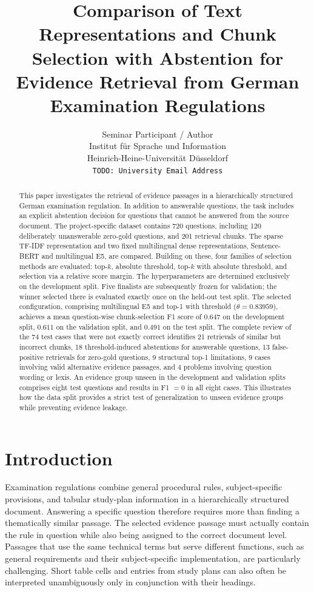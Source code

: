 \documentclass[11pt]{article}
\title{Comparison of Text Representations and Chunk Selection with Abstention for Evidence Retrieval from German Examination Regulations}
\author{Seminar Participant / Author \\
  Institut für Sprache und Information \\
  Heinrich-Heine-Universität Düsseldorf \\
  \texttt{TODO: University Email Address}}
\begin{document}
\maketitle

\begin{abstract}
This paper investigates the retrieval of evidence passages in a hierarchically structured German examination regulation. In addition to answerable questions, the task includes an explicit abstention decision for questions that cannot be answered from the source document. The project-specific dataset contains 720 questions, including 120 deliberately unanswerable zero-gold questions, and 201 retrieval chunks. The sparse TF-IDF representation and two fixed multilingual dense representations, Sentence-BERT and multilingual E5, are compared. Building on these, four families of selection methods are evaluated: top-$k$, absolute threshold, top-$k$ with absolute threshold, and selection via a relative score margin. The hyperparameters are determined exclusively on the development split. Five finalists are subsequently frozen for validation; the winner selected there is evaluated exactly once on the held-out test split. The selected configuration, comprising multilingual E5 and top-1 with threshold ($\theta=0.83959$), achieves a mean question-wise chunk-selection F1 score of $0.647$ on the development split, $0.611$ on the validation split, and $0.491$ on the test split. The complete review of the 74 test cases that were not exactly correct identifies 21 retrievals of similar but incorrect chunks, 18 threshold-induced abstentions for answerable questions, 13 false-positive retrievals for zero-gold questions, 9 structural top-1 limitations, 9 cases involving valid alternative evidence passages, and 4 problems involving question wording or lexis. An evidence group unseen in the development and validation splits comprises eight test questions and results in F1 $=0$ in all eight cases. This illustrates how the data split provides a strict test of generalization to unseen evidence groups while preventing evidence leakage.
\end{abstract}


\section{Introduction}

Examination regulations combine general procedural rules, subject-specific provisions, and tabular study-plan information in a hierarchically structured document. Answering a specific question therefore requires more than finding a thematically similar passage. The selected evidence passage must actually contain the rule in question while also being assigned to the correct document level. Passages that use the same technical terms but serve different functions, such as general requirements and their subject-specific implementation, are particularly challenging. Short table cells and entries from study plans can also often be interpreted unambiguously only in conjunction with their headings.
\end{document}
